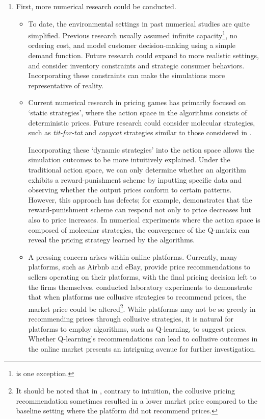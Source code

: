 \documentclass[mnsc,nonblindrev]{workingpaper}
\begin{document}
\begin{enumerate}
\setlength{\itemsep}{1.2em}
    \item First, more numerical research could be conducted.
        \begin{itemize}
        \setlength{\itemsep}{0.55em}
            \item To date, the environmental settings in past numerical studies are quite simplified. Previous research usually assumed infinite capacity\footnote{\cite{abada2023artificial} is one exception.}, no ordering cost, and model customer decision-making using a simple demand function. Future research could expand to more realistic settings, and consider inventory constraints and strategic consumer behaviors. Incorporating these constraints can make the simulations more representative of reality.
            
            \item Current numerical research in pricing games has primarily focused on `static strategies', where the action space in the algorithms consists of deterministic prices. Future research could consider molecular strategies, such as \textit{tit-for-tat} and \textit{copycat} strategies similar to those considered in \cite{kimbrough2005learning}.
            
            Incorporating these `dynamic strategies' into the action space allows the simulation outcomes to be more intuitively explained. Under the traditional action space, we can only determine whether an algorithm exhibits a reward-punishment scheme by inputting specific data and observing whether the output prices conform to certain patterns. However, this approach has defects; for example, \cite{epivent2024algorithmic} demonstrates that the reward-punishment scheme can respond not only to price decreases but also to price increases. In numerical experiments where the action space is composed of molecular strategies, the convergence of the Q-matrix can reveal the pricing strategy learned by the algorithms.

            \item A pressing concern arises within online platforms. Currently, many platforms, such as Airbnb and eBay, provide price recommendations to sellers operating on their platforms, with the final pricing decision left to the firms themselves. \cite{hunold2023algorithmic} conducted laboratory experiments to demonstrate that when platforms use collusive strategies to recommend prices, the market price could be altered\footnote{It should be noted that in \cite{hunold2023algorithmic}, contrary to intuition, the collusive pricing recommendation sometimes resulted in a lower market price compared to the baseline setting where the platform did not recommend prices.}. While platforms may not be so greedy in recommending prices through collusive strategies, it is natural for platforms to employ algorithms, such as Q-learning, to suggest prices. Whether Q-learning's recommendations can lead to collusive outcomes in the online market presents an intriguing avenue for further investigation.
            

\end{itemize}
\end{enumerate}
\end{document}
